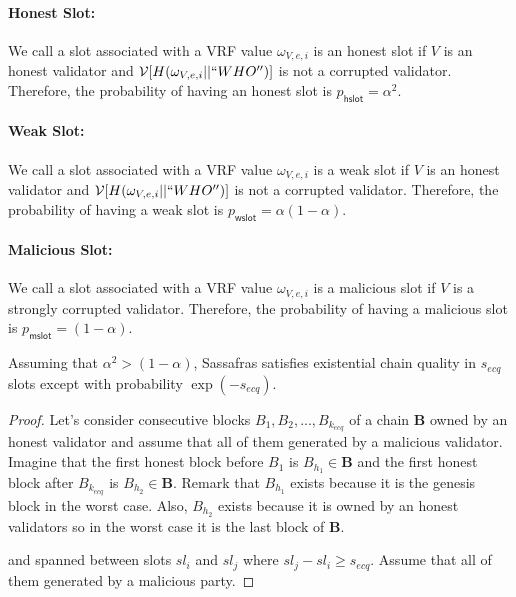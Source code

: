 \paragraph{Honest Slot:} We call a slot associated with a VRF value $ \omega_{V,e,i} $ is an honest slot  if $ V $ is an honest validator and $ \mathcal{V}[H(\omega_{V,e,i}||``WHO'')] $ is not a corrupted validator. Therefore, the probability of having an honest slot is $ p_{\mathsf{hslot}} = \alpha^2 $.  

\paragraph{Weak Slot:} We call a slot associated with a VRF value $ \omega_{V,e,i} $ is a weak slot  if $ V $ is an honest validator and $ \mathcal{V}[H(\omega_{V,e,i}||``WHO'')] $ is not a corrupted validator. Therefore, the probability of having a weak slot is $ p_{\mathsf{wslot}} = \alpha (1-\alpha) $.  

\paragraph{Malicious Slot:}  We call a slot associated with a VRF value $ \omega_{V,e,i} $ is a malicious slot  if $ V $ is a strongly corrupted validator. Therefore, the probability of having a malicious slot is $ p_{\mathsf{mslot}} =  (1-\alpha) $.  



\begin{lemma}[ECQ]
	Assuming that $ \alpha^2 > (1-\alpha) $, Sassafras satisfies existential chain quality in $ s_{ecq} $ slots except with probability $ \exp(-s_{ecq}) $.
\end{lemma}

\begin{proof}
Let's consider consecutive blocks $ B_1, B_2, ..., B_{k_{ecq}} $ of a chain $ \mathbf{B} $ owned by an honest validator  and assume that all of them generated by a malicious validator. Imagine that the first honest block before $ B_1 $ is $ B_{h_1}  \in \mathbf{B}$ and the first honest block after $ B_{k_{ecq}} $ is $ B_{h_2}  \in \mathbf{B}$. Remark that $ B_{h_1} $ exists because it is the genesis block in the worst case. Also, $ B_{h_2} $ exists because it is owned by an honest validators so in the worst case it is the last block of $ \mathbf{B} $. 

 and spanned between  slots $sl_i  $ and $ sl_j $ where $ sl_j - sl_i \geq s_{ecq} $. Assume that all of them generated by a malicious party.
\end{proof}

